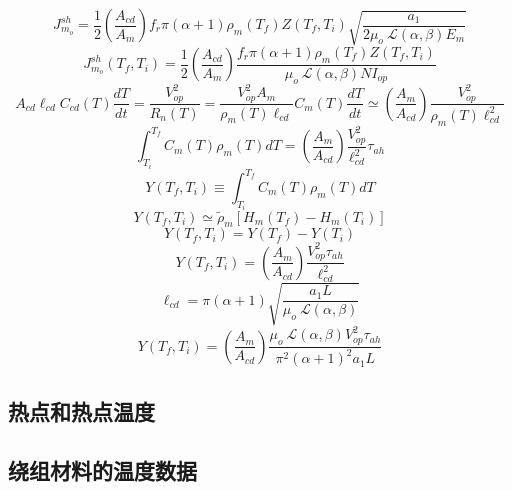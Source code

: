 \begin{equation}%
J_{m_o}^{sh}=\frac{1}{2}\left(\frac{A_{cd}}{A_m}\right)f_r\pi(\alpha+1)\rho_m(T_f)Z(T_f,T_i)\sqrt{\frac{a_1}{2\mu_o\ \mathcal{L}(\alpha,\beta)E_m}}
\end{equation}
\begin{equation}%
J_{m_o}^{sh}(T_f,T_i)=\frac{1}{2}\left(\frac{A_{cd}}{A_m}\right)\frac{f_r\pi(\alpha+1)\rho_m(T_f)Z(T_f,T_i)}{\mu_o\ \mathcal{L}(\alpha,\beta)NI_{op}}
\end{equation}
\begin{equation}%
A_{cd}\ell_{cd}C_{cd}(T)\frac{dT}{dt}=\frac{V_{op}^{2}}{R_n(T)}=\frac{V_{op}^{2}A_m}{\rho_m(T)\ell_{cd}}
C_m(T)\frac{dT}{dt}\simeq\left(\frac{A_m}{A_{cd}}\right)\frac{V_{op}^{2}}{\rho_m(T)\ell_{cd}^{2}}
\end{equation}
\begin{equation}%
\int_{T_i}^{T_f}C_m(T)\rho_m(T)dT=\left(\frac{A_m}{A_{cd}}\right)\frac{V_{op}^{2}}{\ell_{cd}^{2}}\tau_{ah}
\end{equation}
\begin{equation}%
Y(T_f,T_i)\equiv\int_{T_i}^{T_f}C_m(T)\rho_m(T)dT
\end{equation}
\begin{equation}%
Y(T_f,T_i)\simeq\tilde{\rho}_m[H_m(T_f)-H_m(T_i)]
\end{equation}
\begin{equation}%
Y(T_f,T_i)=Y(T_f)-Y(T_i)
\end{equation}
\begin{equation}%
Y(T_f,T_i)=\left(\frac{A_m}{A_{cd}}\right)\frac{V_{op}^{2}\tau_{ah}}{\ell_{cd}^{2}}
\end{equation}
\begin{equation}%
\ell_{cd}=\pi(\alpha+1)\sqrt{\frac{a_1L}{\mu_o\ \mathcal{L}(\alpha,\beta)}}
\end{equation}
\begin{equation}%
Y(T_f,T_i)=\left(\frac{A_m}{A_{cd}}\right)\frac{\mu_o\ \mathcal{L}(\alpha,\beta)V_{op}^{2}\tau_{ah}}{\pi^2(\alpha+1)^2a_1L}
\end{equation}


\subsection{热点和热点温度}

\subsection{绕组材料的温度数据}

